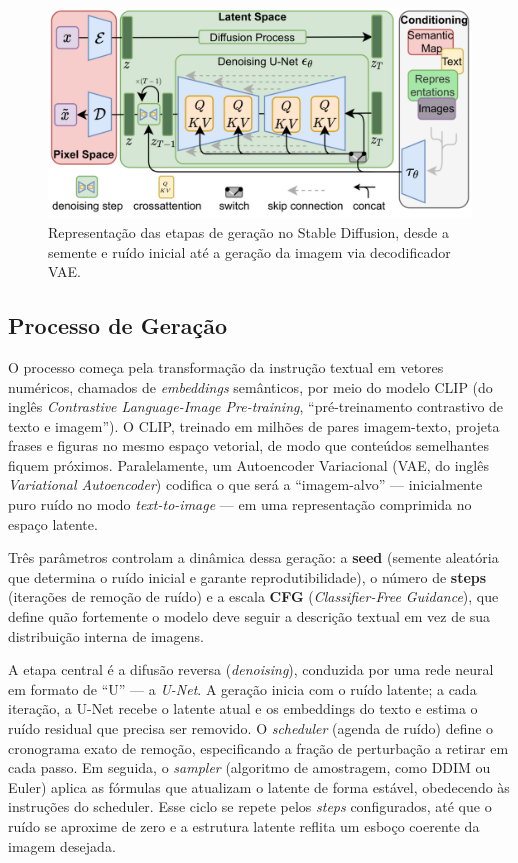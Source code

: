 \documentclass[12pt, %
openright, 
oneside, %
a4paper,    %
brazil]{facom-ufu-abntex2}
\begin{document}
\begin{figure}[H]
    \centering
	\includegraphics[width=0.9\linewidth]{sdxl-flow.png}
	\caption[Diagrama do fluxo lógico dos modelos de difusão latente]{Representação das etapas de geração no Stable Diffusion, desde a semente e ruído inicial até a geração da imagem via decodificador VAE.}
	\label{fig:diagramaFluxoStableDiffusion}
\end{figure}

\subsection{Processo de Geração}

O processo começa pela transformação da instrução textual em vetores numéricos, chamados de \emph{embeddings} semânticos, por meio do modelo CLIP (do inglês \emph{Contrastive Language-Image Pre-training}, “pré-treinamento contrastivo de texto e imagem”). O CLIP, treinado em milhões de pares imagem-texto, projeta frases e figuras no mesmo espaço vetorial, de modo que conteúdos semelhantes fiquem próximos. Paralelamente, um Autoencoder Variacional (VAE, do inglês \emph{Variational Autoencoder}) codifica o que será a “imagem-alvo” — inicialmente puro ruído no modo \emph{text-to-image} — em uma representação comprimida no espaço latente.

Três parâmetros controlam a dinâmica dessa geração: a \textbf{seed} (semente aleatória que determina o ruído inicial e garante reprodutibilidade), o número de \textbf{steps} (iterações de remoção de ruído) e a escala \textbf{CFG} (\emph{Classifier-Free Guidance}), que define quão fortemente o modelo deve seguir a descrição textual em vez de sua distribuição interna de imagens.

A etapa central é a difusão reversa (\emph{denoising}), conduzida por uma rede neural em formato de “U” — a \emph{U-Net}. A geração inicia com o ruído latente; a cada iteração, a U-Net recebe o latente atual e os embeddings do texto e estima o ruído residual que precisa ser removido. O \emph{scheduler} (agenda de ruído) define o cronograma exato de remoção, especificando a fração de perturbação a retirar em cada passo. Em seguida, o \emph{sampler} (algoritmo de amostragem, como DDIM ou Euler) aplica as fórmulas que atualizam o latente de forma estável, obedecendo às instruções do scheduler. Esse ciclo se repete pelos \emph{steps} configurados, até que o ruído se aproxime de zero e a estrutura latente reflita um esboço coerente da imagem desejada.
\end{document}
